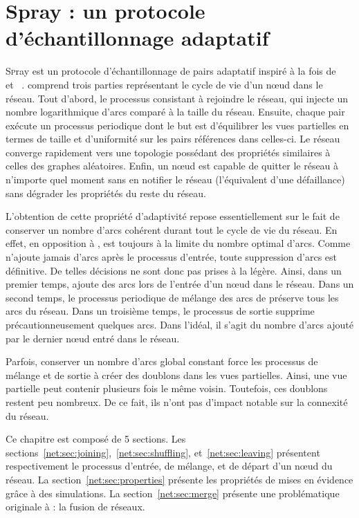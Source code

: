 
\chapter{Spray : un protocole d'échantillonnage adaptatif}
\label{net:chap:spray}
\minitoc

\lettrine{S}pray est un protocole d'échantillonnage de pairs adaptatif inspiré à
la fois de \SCAMP~\cite{ganesh2003peer} et
\CYCLON~\cite{voulgaris2005cyclon}. \SPRAY comprend trois parties représentant
le cycle de vie d'un nœud dans le réseau. Tout d'abord, le processus consistant
à rejoindre le réseau, qui injecte un nombre logarithmique d'arcs comparé à la
taille du réseau.  Ensuite, chaque pair exécute un processus periodique dont le
but est d'équilibrer les vues partielles en termes de taille et d'uniformité sur
les pairs références dans celles-ci. Le réseau converge rapidement vers une
topologie possédant des propriétés similaires à celles des graphes
aléatoires. Enfin, un nœud est capable de quitter le réseau à n'importe quel
moment sans en notifier le réseau (l'équivalent d'une défaillance) sans dégrader
les propriétés du reste du réseau.

L'obtention de cette propriété d'adaptivité repose essentiellement sur le fait
de conserver un nombre d'arcs cohérent durant tout le cycle de vie du réseau.
En effet, en opposition à \CYCLON, \SPRAY est toujours à la limite du nombre
optimal d'arcs. Comme \SPRAY n'ajoute jamais d'arcs après le processus d'entrée,
toute suppression d'arcs est définitive. De telles décisions ne sont donc pas
prises à la légère. Ainsi, dans un premier temps, \SPRAY ajoute des arcs lors de
l'entrée d'un nœud dans le réseau. Dans un second temps, le processus periodique
de mélange des arcs de \SPRAY préserve tous les arcs du réseau.  Dans un
troisième temps, le processus de sortie supprime précautionneusement quelques
arcs. Dans l'idéal, il s'agit du nombre d'arcs ajouté par le dernier nœud entré
dans le réseau.

Parfois, conserver un nombre d'arcs global constant force les processus de
mélange et de sortie à créer des doublons dans les vues partielles. Ainsi, une
vue partielle peut contenir plusieurs fois le même voisin. Toutefois, ces
doublons restent peu nombreux. De ce fait, ils n'ont pas d'impact notable sur la
connexité du réseau.

Ce chapitre est composé de 5 sections. Les
sections~\ref{net:sec:joining},~\ref{net:sec:shuffling},
et~\ref{net:sec:leaving} présentent respectivement le processus d'entrée, de
mélange, et de départ d'un nœud du réseau. La section~\ref{net:sec:properties}
présente les propriétés de \SPRAY mises en évidence grâce à des simulations. La
section~\ref{net:sec:merge} présente une problématique originale à \SPRAY : la
fusion de réseaux.

